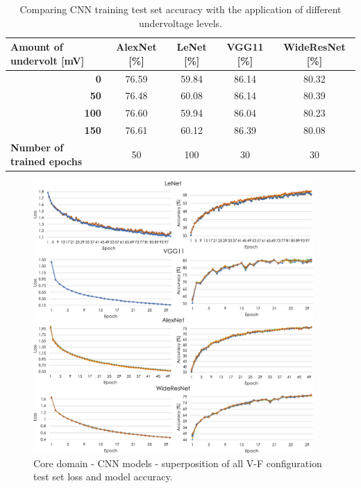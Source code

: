 \begin{table}[htb]
    \centering
   
    \label{tab:trainingAcc}
    \begin{tabular}{rcccc}
        \multicolumn{1}{l}{{\textbf{Amount of undervolt {[}mV{]}}}} &
          \textbf{AlexNet {[}\%{]}} &
          \textbf{LeNet {[}\%{]}} &
          \textbf{VGG11 {[}\%{]}} &
          \textbf{WideResNet {[}\%{]}} \\ \hline
        \textbf{0}   & 76.59 & 59.84 & 86.14 & 80.32 \\
        \textbf{50}  & 76.48 & 60.08 & 86.14 & 80.39 \\
        \textbf{100} & 76.60 & 59.94 & 86.04 & 80.23 \\
        \textbf{150} & 76.61 & 60.12 & 86.39 & 80.08 \\ \hline
        \multicolumn{1}{l}{{\textbf{Number of trained epochs}}} &
          50 &
          100 &
          30 &
          30
    \end{tabular}%
     \caption{Comparing CNN training test set accuracy with the application of different undervoltage levels.}
\end{table}

\begin{figure}[htb]
    \centering
        \includegraphics[width=0.95\textwidth]{Figures/Application To Deep Learning/CNN_loss_acc.pdf}
        \caption{Core domain - CNN models - superposition of all V-F configuration test set loss and model accuracy.}
    \label{fig:CNN_loss}
\end{figure}

